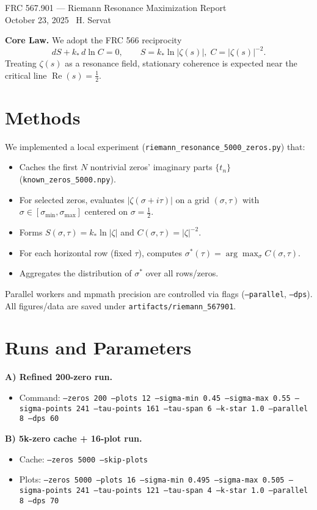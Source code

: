 \documentclass[10pt]{article}
\begin{document}
\begin{center}
{\Large FRC 567.901 — Riemann Resonance Maximization Report}\\
{\large October 23, 2025}\
\vspace{4pt}
H. Servat
\end{center}

\textbf{Core Law.} We adopt the FRC 566 reciprocity
\begin{equation}
 dS + k_*\, d\ln C = 0,\qquad S = k_*\ln |\zeta(s)|,\; C = |\zeta(s)|^{-2}.
\end{equation}
Treating $\zeta(s)$ as a resonance field, stationary coherence is expected near the critical line $\operatorname{Re}(s)=\tfrac12$.

\section*{Methods}
We implemented a local experiment (\texttt{riemann\_resonance\_5000\_zeros.py}) that:
\begin{itemize}
  \item Caches the first $N$ nontrivial zeros' imaginary parts $\{t_n\}$ (\texttt{known\_zeros\_5000.npy}).
  \item For selected zeros, evaluates $|\zeta(\sigma + i\tau)|$ on a grid $(\sigma,\tau)$ with $\sigma\in[\sigma_{\min},\sigma_{\max}]$ centered on $\sigma=\tfrac12$.
  \item Forms $S(\sigma,\tau)=k_*\ln|\zeta|$ and $C(\sigma,\tau)=|\zeta|^{-2}$.
  \item For each horizontal row (fixed $\tau$), computes $\sigma^*(\tau)=\arg\max_{\sigma} C(\sigma,\tau)$.
  \item Aggregates the distribution of $\sigma^*$ over all rows/zeros.
\end{itemize}
Parallel workers and mpmath precision are controlled via flags (\texttt{--parallel}, \texttt{--dps}). All figures/data are saved under \texttt{artifacts/riemann\_567901}.

\section*{Runs and Parameters}
\textbf{A) Refined 200-zero run.}
\begin{itemize}
  \item Command: \texttt{--zeros 200 --plots 12 --sigma-min 0.45 --sigma-max 0.55 --sigma-points 241 --tau-points 161 --tau-span 6 --k-star 1.0 --parallel 8 --dps 60}
\end{itemize}
\textbf{B) 5k-zero cache + 16-plot run.}
\begin{itemize}
  \item Cache: \texttt{--zeros 5000 --skip-plots}
  \item Plots: \texttt{--zeros 5000 --plots 16 --sigma-min 0.495 --sigma-max 0.505 --sigma-points 241 --tau-points 121 --tau-span 4 --k-star 1.0 --parallel 8 --dps 70}
\end{itemize}
\end{document}
